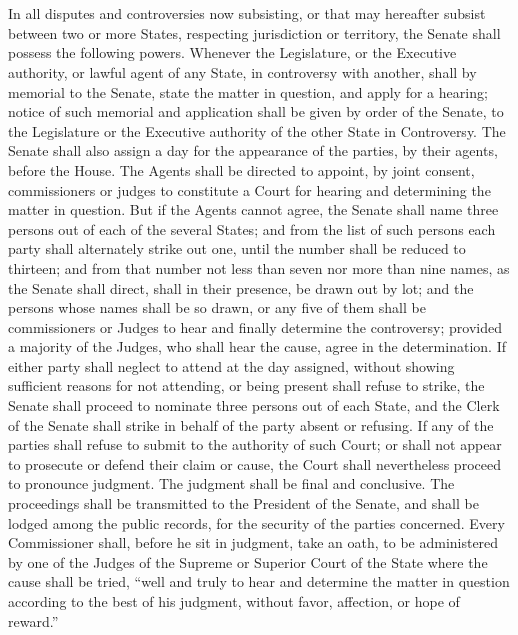 \documentclass{constitution}
\begin{document}
\section{}
In all disputes and controversies now subsisting, or that may hereafter subsist between two or more States, respecting jurisdiction or territory, the Senate shall possess the following powers.
Whenever the Legislature, or the Executive authority, or lawful agent of any State, in controversy with another,
shall by memorial to the Senate, state the matter in question, and apply for a hearing;
notice of such memorial and application shall be given by order of the Senate,
to the Legislature or the Executive authority of the other State in Controversy.
The Senate shall also assign a day for the appearance of the parties, by their agents, before the House.
The Agents shall be directed to appoint, by joint consent, commissioners or judges to constitute a Court for hearing and determining the matter in question.
But if the Agents cannot agree, the Senate shall name three persons out of each of the several States;
and from the list of such persons each party shall alternately strike out one, until the number shall be reduced to thirteen;
and from that number not less than seven nor more than nine names, as the Senate shall direct, shall in their presence, be drawn out by lot;
and the persons whose names shall be so drawn, or any five of them
shall be commissioners or Judges to hear and finally determine the controversy;
provided a majority of the Judges, who shall hear the cause, agree in the determination.
If either party shall neglect to attend at the day assigned, without showing sufficient reasons for not attending,
or being present shall refuse to strike,
the Senate shall proceed to nominate three persons out of each State,
and the Clerk of the Senate shall strike in behalf of the party absent or refusing.
If any of the parties shall refuse to submit to the authority of such Court;
or shall not appear to prosecute or defend their claim or cause,
the Court shall nevertheless proceed to pronounce judgment.
The judgment shall be final and conclusive.
The proceedings shall be transmitted to the President of the Senate, and shall be lodged among the public records, for the security of the parties concerned.
Every Commissioner shall, before he sit in judgment, take an oath, to be administered by one of the Judges of the Supreme or Superior Court of the State where the cause shall be tried,
“well and truly to hear and determine the matter in question according to the best of his judgment, without favor, affection, or hope of reward.”
\end{document}
